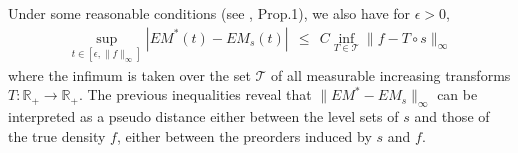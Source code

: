 Under some reasonable conditions (see \cite{AISTAT15}, Prop.1), we also have 
for $\epsilon >0$, 
\begin{align*}
\sup_{t\in[\epsilon ,\|f\|_\infty]}|EM^*(t)-EM_s(t)| ~~\le~~  C \inf_{T  \in \mathcal{T}} \|f-T\circ s\|_\infty
\end{align*}
where the infimum is taken over the set $\mathcal{T}$ of all measurable increasing transforms $T : \mathbb{R}_+ \rightarrow \mathbb{R}_+$.
The previous inequalities reveal that $\|EM^* - EM_s\|_\infty$ can be interpreted as a pseudo distance either between the level sets of $s$ and those of the true density $f$, either between the preorders induced by $s$ and $f$. %


